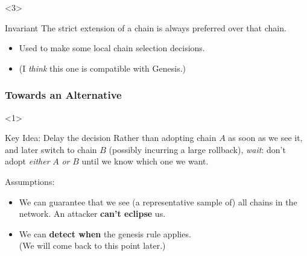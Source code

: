 \documentclass[t]{beamer}
\begin{document}
\begin{frame}

\begin{onlyenv}<3>

\begin{alertblock}{Invariant}
The strict extension of a chain is always preferred over that chain.
\end{alertblock}

\begin{itemize}
\item Used to make some local chain selection decisions.
\item (I \emph{think} this one is compatible with Genesis.)
\end{itemize}

\end{onlyenv}

\end{frame}


\begin{frame}
\frametitle{Towards an Alternative}

\begin{onlyenv}<1>

\begin{alertblock}{Key Idea: Delay the decision}
Rather than adopting chain $A$ as soon as we see it,
and later switch to chain $B$ (possibly incurring a large rollback), \emph{wait}:
don't adopt \emph{either} $A$ \emph{or} $B$ until we know which one we want.
\end{alertblock}

Assumptions:

\begin{itemize}
\item We can guarantee that we see (a representative sample of) all chains
in the network. An attacker \textbf{can't eclipse} us.
\item We can \textbf{detect when} the genesis rule applies. \\
(We will come back to this point later.)
\end{itemize}

\end{onlyenv}

\end{frame}

\end{document}
